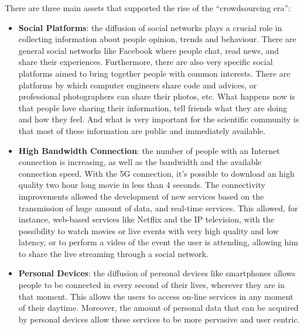 There are three main assets that supported the rise of the ``crowdsourcing era'':
\begin{itemize}
	\item \textbf{Social Platforms}: the diffusion of social networks plays a crucial role in collecting information about people opinion, trends and behaviour. There are general social networks like Facebook where people chat, read news, and share their experiences. Furthermore, there are also very specific social platforms aimed to bring together people with common interests. There are platforms by which computer engineers share code and advices, or professional photographers can share their photos, etc. What happens now is that people love sharing their information, tell friends what they are doing and how they feel. And what is very important for the scientific community is that most of these information are public and immediately available.
	\item \textbf{High Bandwidth Connection}: the number of people with an Internet connection is increasing, as well as the bandwidth and the available connection speed. With the 5G connection, it's possible to download an high quality two hour long movie in less than 4 seconds. 
	The connectivity improvements allowed the development of new services based on the transmission of huge amount of data, and real-time services. This allowed, for instance, web-based services like Netflix and the IP television, with the possibility to watch movies or live events with very high quality and low latency, or to perform a video of the event the user is attending, allowing him to share the live streaming through a social network.
	\item \textbf{Personal Devices}: the diffusion of personal devices like smartphones allows people to be connected in every second of their lives, wherever they are in that moment. This allows the users to access on-line services in any moment of their daytime. Moreover, the amount of personal data that can be acquired by personal devices allow these services to be more pervasive and user centric.%
\end{itemize}

